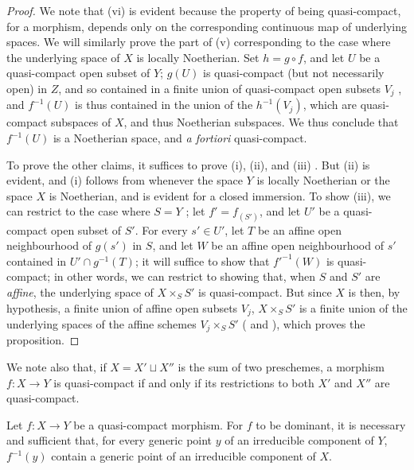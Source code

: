 \begin{proof}
We note that (vi) is evident because the property of being quasi-compact, for a morphism, depends only on the corresponding continuous map of underlying spaces.
We will similarly prove the part of (v) corresponding to the case where the underlying space of $X$ is locally Noetherian.
Set $h=g\circ f$, and let $U$ be a quasi-compact open subset of $Y$;
$g(U)$ is quasi-compact (but not necessarily open) in $Z$, and so contained in a finite union of quasi-compact open subsets $V_j$ , and $f^{-1}(U)$ is thus contained in the union of the $h^{-1}(V_j)$, which are quasi-compact subspaces of $X$, and thus Noetherian subspaces.
We thus conclude  that $f^{-1}(U)$ is a Noetherian space, and \emph{a fortiori} quasi-compact.

To prove the other claims, it suffices to prove (i), (ii), and (iii) .
But (ii) is evident, and (i) follows from  whenever the space $Y$ is locally Noetherian or the space $X$ is Noetherian, and is evident for a closed immersion.
To show (iii),
we can restrict to the case where $S=Y$ ;
let $f'=f_{(S')}$, and let $U'$ be a quasi-compact open subset of $S'$.
For every $s'\in U'$, let $T$ be an affine open neighbourhood of $g(s')$ in $S$, and let $W$ be an affine open neighbourhood of $s'$ contained in $U'\cap g^{-1}(T)$;
it will suffice to show that $f'^{-1}(W)$ is quasi-compact;
in other words, we can restrict to showing that, when $S$ and $S'$ are \emph{affine}, the underlying space of $X\times_S S'$ is quasi-compact.
But since $X$ is then, by hypothesis, a finite union of affine open subsets $V_j$, $X\times_S S'$ is a finite union of the underlying spaces of the affine schemes $V_j\times_S S'$ ( and ), which proves the proposition.
\end{proof}

We note also that, if $X=X'\sqcup X''$ is the sum of two preschemes, a morphism $f:X\to Y$ is quasi-compact if and only if its restrictions to both $X'$ and $X''$ are quasi-compact.

\begin{proposition}[6.6.5]
\label{I.6.6.5}
Let $f:X\to Y$ be a quasi-compact morphism.
For $f$ to be dominant, it is necessary and sufficient that, for every generic point $y$ of an irreducible component of $Y$, $f^{-1}(y)$ contain a generic point of an irreducible component of $X$.
\end{proposition}

